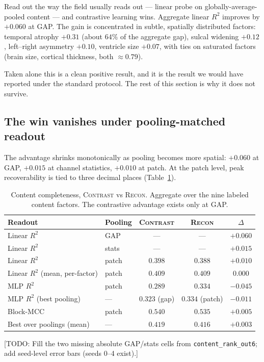 \documentclass[11pt]{article}
\newcommand{\todo}[1]{{\color{blue}\small[TODO: #1]}}
\begin{document}
Read out the way the field usually reads out --- linear probe on
globally-average-pooled content --- and contrastive learning wins. Aggregate
linear $R^2$ improves by $+0.060$ at GAP. The gain is concentrated in subtle,
spatially distributed factors: temporal atrophy $+0.31$ (about $64\%$ of the
aggregate gap), sulcal widening $+0.12$, left--right asymmetry $+0.10$,
ventricle size $+0.07$, with ties on saturated factors (brain size, cortical
thickness, both $\approx\!0.79$).

Taken alone this is a clean positive result, and it is the result we would have
reported under the standard protocol. The rest of this section is why it does
not survive.

\subsection{The win vanishes under pooling-matched readout}
\label{sec:completeness}

The advantage shrinks monotonically as pooling becomes more spatial: $+0.060$ at
GAP, $+0.015$ at channel statistics, $+0.010$ at patch. At the patch level, peak
recoverability is tied to three decimal places (Table~\ref{tab:completeness}).

\begin{table}[t]
\centering
\caption{Content completeness, \textsc{Contrast} vs \textsc{Recon}. Aggregate
over the nine labeled content factors. The contrastive advantage exists only at
GAP.}
\label{tab:completeness}
\begin{tabular}{llccc}
\toprule
Readout & Pooling & \textsc{Contrast} & \textsc{Recon} & $\Delta$ \\
\midrule
Linear $R^2$        & GAP    & --- & --- & $+0.060$ \\
Linear $R^2$        & stats  & --- & --- & $+0.015$ \\
Linear $R^2$        & patch  & $0.398$ & $0.388$ & $+0.010$ \\
Linear $R^2$ (mean, per-factor) & patch & $0.409$ & $0.409$ & $0.000$ \\
MLP $R^2$           & patch  & $0.289$ & $0.334$ & $-0.045$ \\
MLP $R^2$ (best pooling) & ---   & $0.323$ (gap) & $0.334$ (patch) & $-0.011$ \\
Block-MCC           & patch  & $0.540$ & $0.535$ & $+0.005$ \\
Best over poolings (mean) & --- & $0.419$ & $0.416$ & $+0.003$ \\
\bottomrule
\end{tabular}
\todo{Fill the two missing absolute GAP/stats cells from
\texttt{content\_rank\_out6}; add seed-level error bars (seeds 0--4 exist).}
\end{table}
\end{document}
